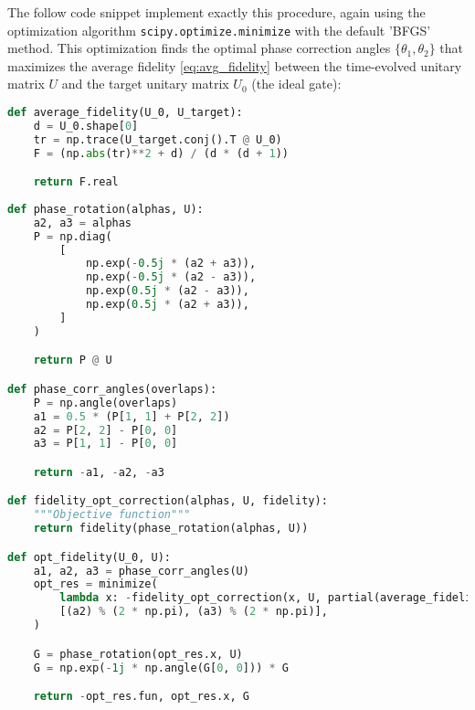 \documentclass{subfiles}
\begin{document}
The follow code snippet implement exactly this procedure, again using the optimization algorithm \texttt{scipy.optimize.minimize} with the default 'BFGS' method. This optimization finds the optimal phase correction angles $\{\theta_1, \theta_2\}$ that maximizes the average fidelity \eqref{eq:avg_fidelity} between the time-evolved unitary matrix $U$ and the target unitary matrix $U_0$ (the ideal gate): 
\begin{lstlisting}[language=Python]
def average_fidelity(U_0, U_target):
    d = U_0.shape[0]
    tr = np.trace(U_target.conj().T @ U_0)
    F = (np.abs(tr)**2 + d) / (d * (d + 1))

    return F.real
 
def phase_rotation(alphas, U):
    a2, a3 = alphas
    P = np.diag(
        [
            np.exp(-0.5j * (a2 + a3)),
            np.exp(-0.5j * (a2 - a3)),
            np.exp(0.5j * (a2 - a3)),
            np.exp(0.5j * (a2 + a3)),
        ]
    )

    return P @ U

def phase_corr_angles(overlaps):
    P = np.angle(overlaps)
    a1 = 0.5 * (P[1, 1] + P[2, 2])
    a2 = P[2, 2] - P[0, 0]
    a3 = P[1, 1] - P[0, 0]

    return -a1, -a2, -a3

def fidelity_opt_correction(alphas, U, fidelity):
    """Objective function"""
    return fidelity(phase_rotation(alphas, U))

def opt_fidelity(U_0, U):
    a1, a2, a3 = phase_corr_angles(U)
    opt_res = minimize(
        lambda x: -fidelity_opt_correction(x, U, partial(average_fidelity, U_0)),
        [(a2) % (2 * np.pi), (a3) % (2 * np.pi)],
    )

    G = phase_rotation(opt_res.x, U)
    G = np.exp(-1j * np.angle(G[0, 0])) * G

    return -opt_res.fun, opt_res.x, G
\end{lstlisting}
\end{document}
